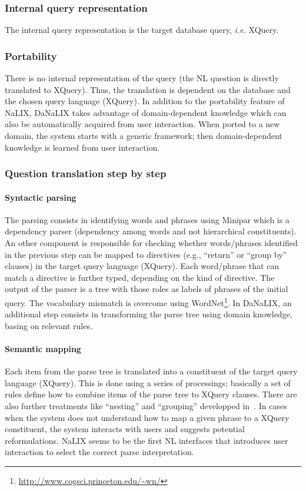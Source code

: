 \documentclass[10pt,journal,letterpaper,compsoc]{IEEEtran}
\begin{document}
\subsubsection{Internal query representation}
The internal query representation is the target database query, {\it i.e.}
XQuery.

\subsubsection{Portability}
There is no internal representation of the query (the NL
question is directly translated to XQuery). Thus, the translation is dependent
on the database and the chosen query language (XQuery).
In addition to the portability feature of {\sc NaLIX}, {\sc DaNaLIX} takes
advantage of domain-dependent knowledge which can also be automatically acquired
from user interaction. When ported to a new domain, the system starts with a
generic framework; then domain-dependent knowledge is learned from user
interaction. 





\subsubsection{Question translation step by step}
\paragraph{Syntactic parsing}
The parsing consists in identifying words and
phrases using {\sc Minipar} which is a dependency parser (dependency among
words and not hierarchical constituents).
An other component is responsible for checking whether words/phrases
identified in the previous step can be mapped to directives (e.g.,
``return'' or ``group by'' clauses) in the target query language (XQuery).
Each word/phrase that can match a directive is further typed, depending on
the kind of directive.
The output of the parser is a tree with those roles as labels of phrases
of the initial query.
The vocabulary mismatch is overcome using
WordNet\footnote{\url{http://www.cogsci.princeton.edu/~wn/}}.
In {\sc DaNaLIX}, an additional step consists in transforming the parse tree
using domain knowledge, basing on relevant rules. 

\paragraph{Semantic mapping}
Each item from the parse tree is translated into a constituent of the target
query language (XQuery). This is done using a series of processings; basically
a set of rules define how to combine items of the parse tree to XQuery
clauses. There are also further treatments like ``nesting'' and ``grouping''
developped in~\cite{DBLP:conf/edbt/LiYJ06}.
In cases when the system does not understand how to map a given phrase to a
XQuery constituent, the system interacts with users and suggests potential
reformulations. {\sc NaLIX} seems to be the first NL interfaces that
introduces user interaction to select the correct parse interpretation.
\end{document}
